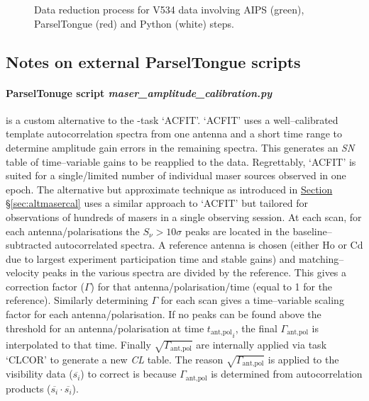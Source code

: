 {\begin{figure}
            \caption[Data Reduction Process for V534]{Data reduction process for V534 data involving AIPS (green), ParselTongue (red) and Python (white) steps.}
            \label{fig:v534_pipeline}
        \end{figure}
        \clearpage 
        }
    \subsection{Notes on external ParselTongue scripts}
        \label{sec:external_scripts}
        \paragraph{ParselTonuge script \textit{maser\_amplitude\_calibration.py}} is a custom alternative to the \aips-task `ACFIT'. `ACFIT' uses a well--calibrated template autocorrelation spectra from one antenna and a short time range to determine amplitude gain errors in the remaining spectra. This generates an \textit{SN} table of time--variable gains to be reapplied to the data. Regrettably, `ACFIT' is suited for a single/limited number of individual maser sources observed in one epoch. The alternative but approximate technique as introduced in \hyperref[sec:altmasercal]{Section \S\ref*{sec:altmasercal}} uses a similar approach to `ACFIT' but tailored for observations of hundreds of masers in a single observing session.
        At each scan, for each antenna/polarisations the $S_\nu>10\sigma$ peaks are located in the baseline--subtracted autocorrelated spectra. A reference antenna is chosen (either Ho or Cd due to largest experiment participation time and stable gains) and matching--velocity peaks in the various spectra are divided by the reference. This gives a correction factor ($\Gamma$) for that antenna/polarisation/time (equal to 1 for the reference). Similarly determining $\Gamma$ for each scan gives a time--variable scaling factor for each antenna/polarisation.  If no peaks can be found above the threshold for an antenna/polarisation at time ${t_\text{ant,pol}}_i$, the final $\Gamma_\text{ant,pol}$ is interpolated to that time. Finally $\sqrt{\Gamma_\text{ant,pol}}$ are internally applied via task `CLCOR' to generate a new \textit{CL} table. The reason $\sqrt{\Gamma_\text{ant,pol}}$ is applied to the visibility data ($\overline{s_i}$) to correct is because $\Gamma_\text{ant,pol}$ is determined from autocorrelation products ($\overline{s_i}\cdot \overline{s_i}$).
        
